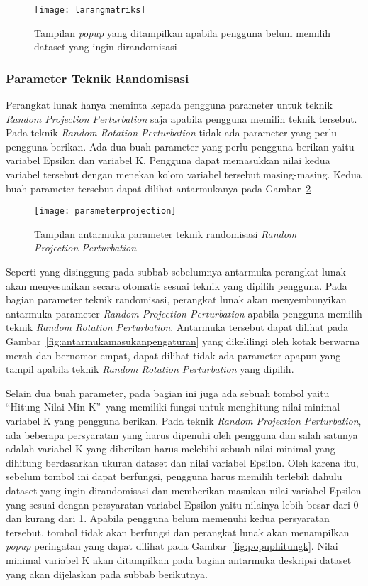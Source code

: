 \begin{figure}
	\centering
	\texttt{[image: larangmatriks]}
	\caption{Tampilan \textit{popup} yang ditampilkan apabila pengguna belum memilih dataset yang ingin dirandomisasi}
	\label{fig:larangmatriks}
\end{figure}

\subsubsection{Parameter Teknik Randomisasi}
\label{sec:parameterteknik}

Perangkat lunak hanya meminta kepada pengguna parameter untuk teknik \textit{Random Projection Perturbation} saja apabila pengguna memilih teknik tersebut. Pada teknik \textit{Random Rotation Perturbation} tidak ada parameter yang perlu pengguna berikan. Ada dua buah parameter yang perlu pengguna berikan yaitu variabel Epsilon dan variabel K. Pengguna dapat memasukkan nilai kedua variabel tersebut dengan menekan kolom variabel tersebut masing-masing. Kedua buah parameter tersebut dapat dilihat antarmukanya pada Gambar~\ref{fig:parameterprojection}

\begin{figure}
	\centering
	\texttt{[image: parameterprojection]}
	\caption{Tampilan antarmuka parameter teknik randomisasi \textit{Random Projection Perturbation}}
	\label{fig:parameterprojection}
\end{figure}

Seperti yang disinggung pada subbab sebelumnya antarmuka perangkat lunak akan menyesuaikan secara otomatis sesuai teknik yang dipilih pengguna. Pada bagian parameter teknik randomisasi, perangkat lunak akan menyembunyikan antarmuka parameter \textit{Random Projection Perturbation} apabila pengguna memilih teknik \textit{Random Rotation Perturbation}. Antarmuka tersebut dapat dilihat pada Gambar~\ref{fig:antarmukamasukanpengaturan} yang dikelilingi oleh kotak berwarna merah dan bernomor empat, dapat dilihat tidak ada parameter apapun yang tampil apabila teknik \textit{Random Rotation Perturbation} yang dipilih.

Selain dua buah parameter, pada bagian ini juga ada sebuah tombol yaitu \textquotedblleft Hitung Nilai Min K\textquotedblright~yang memiliki fungsi untuk menghitung nilai minimal variabel K yang pengguna berikan. Pada teknik \textit{Random Projection Perturbation}, ada beberapa persyaratan yang harus dipenuhi oleh pengguna dan salah satunya adalah variabel K yang diberikan harus melebihi sebuah nilai minimal yang dihitung berdasarkan ukuran dataset dan nilai variabel Epsilon. Oleh karena itu, sebelum tombol ini dapat berfungsi, pengguna harus memilih terlebih dahulu dataset yang ingin dirandomisasi dan memberikan masukan nilai variabel Epsilon yang sesuai dengan persyaratan variabel Epsilon yaitu nilainya lebih besar dari 0 dan kurang dari 1. Apabila pengguna belum memenuhi kedua persyaratan tersebut, tombol tidak akan berfungsi dan perangkat lunak akan menampilkan \textit{popup} peringatan yang dapat dilihat pada Gambar~\ref{fig:popuphitungk}. Nilai minimal variabel K akan ditampilkan pada bagian antarmuka deskripsi dataset yang akan dijelaskan pada subbab berikutnya.

